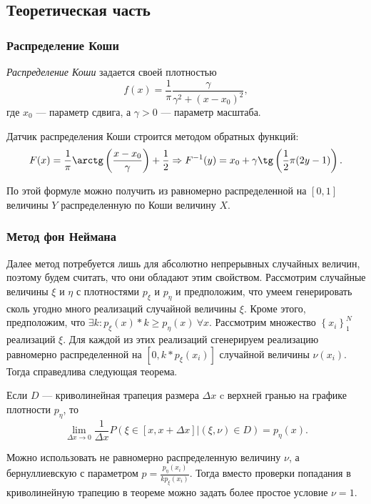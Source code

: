 \documentclass[12pt, a4paper]{article}
\begin{document}
\subsection{Теоретическая часть}
\subsubsection{Распределение Коши}
\begin{df}
\textit{Распределение Коши} задается своей плотностью 
\[f(x) =\frac 1\pi \frac \gamma{\gamma^2 + (x-x_0)^2},\]
где $x_0$ --- параметр сдвига, а $\gamma > 0$ --- параметр масштаба.
\end{df}

Датчик распределения Коши строится методом обратных функций:
\[F(x) = \frac 1\pi \arctg\left(\frac{x-x_0}{\gamma}\right) + \frac 12 	\Rightarrow  F^{-1}(y) = x_0 + \gamma\tg\left(\frac 12 \pi (2y - 1)\right).\] 

По этой формуле можно получить из равномерно распределенной на $[0,1]$ величины $Y$ распределенную по Коши величину $X$.

\subsubsection{Метод фон Неймана}
Далее метод потребуется лишь для абсолютно непрерывных случайных величин, поэтому будем считать, что они обладают этим свойством. Рассмотрим случайные величины $\xi$ и $\eta$ с плотностями $p_\xi$ и $p_\eta$ и предположим, что умеем генерировать сколь угодно много реализаций случайной величины $\xi$. Кроме этого, предположим, что $\exists k\colon p_\xi(x) * k \geqslant p_\eta(x)\ \forall x$. %
Рассмотрим множество $\left\{ x_i \right\}_1^N$ реализаций $\xi$. Для каждой из этих реализаций сгенерируем реализацию равномерно распределенной на $[0,k*p_\xi(x_i)]$ случайной величины $\nu(x_i)$. Тогда справедлива следующая теорема.
\begin{theorem}
Если $D$ --- криволинейная трапеция размера $\Delta x$ c верхней гранью на графике плотности $p_\eta$, то
\[\lim\limits_{\Delta x \to 0} \frac 1{\Delta x} P(\xi \in [x,x+\Delta x]|(\xi,\nu)\in D) = p_\eta(x).\]
\end{theorem}
\begin{note}
Можно использовать не равномерно распределенную величину $\nu$, а бернуллиевскую с параметром $p=\frac{p_\eta(x_i)}{k p_\xi(x_i)}.$ Тогда вместо проверки попадания в криволинейную трапецию в теореме можно задать более простое условие $\nu = 1$.
\end{note}
\end{document}
